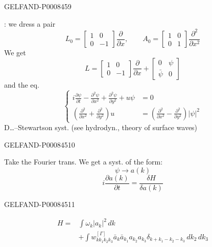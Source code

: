 \begin{GelfandAdjacentEvidence}{GELFAND-P000845}{9}


: we dress a pair
\[
L_0=\begin{bmatrix}1&0\\0&-1\end{bmatrix}\frac{\partial}{\partial x},
\qquad
A_0=\begin{bmatrix}1&0\\0&1\end{bmatrix}\frac{\partial^2}{\partial x^2}
\]
We get
\[
L=\begin{bmatrix}1&0\\0&-1\end{bmatrix}\frac{\partial}{\partial x}
+\begin{bmatrix}0&\psi\\\bar\psi&0\end{bmatrix}
\]
and the eq.
\begin{equation*}
\left\{\begin{aligned}
i\frac{\partial\psi}{\partial t}-\frac{\partial^2\psi}{\partial x^2}
+\frac{\partial^2\psi}{\partial y^2}+u\psi&=0\\
\left(\frac{\partial^2}{\partial x^2}+\frac{\partial^2}{\partial y^2}\right)u
&=\left(\frac{\partial^2}{\partial x^2}-\frac{\partial^2}{\partial y^2}\right)|\psi|^2
\end{aligned}\right.
\tag{6}
\end{equation*}
D…–Stewartson syst. (see hydrodyn., theory of surface waves)
\end{GelfandAdjacentEvidence}
\begin{GelfandAdjacentEvidence}{GELFAND-P000845}{10}


Take the Fourier trans. We get a syst. of the form:
\[
\psi\to a(k)
\]
\[
i\frac{\partial a(k)}{\partial t}=\frac{\delta H}{\delta a(k)}
\]
\end{GelfandAdjacentEvidence}
\begin{GelfandAdjacentEvidence}{GELFAND-P000845}{11}


\[
\begin{aligned}
H={}&\int\omega_k|a_k|^2\,dk\\
&+\int w^{[\Gamma]}_{kk_1k_2k_3}
\bar a_k\bar a_{k_1}a_{k_2}a_{k_3}
\delta_{k+k_1-k_2-k_3}\,dk_2\,dk_3
\end{aligned}
\]
\end{GelfandAdjacentEvidence}
